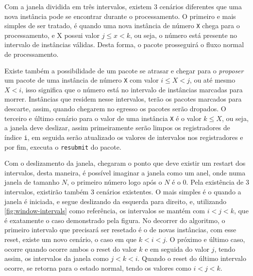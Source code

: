 \documentclass[
    12pt,
    openright, 
    oneside,
    a4paper,
    french,
    english,
    brazil
    ]{facom-ufu-abntex2}
\theoremstyle{definition}
\begin{document}

Com a janela dividida em três intervalos, existem 3 cenários diferentes que uma nova instância pode se encontrar durante o
processamento. O primeiro e mais simples de ser tratado, é quando uma nova instância de número \texttt{X} chega para
o processamento, e X possui valor $j \leq x < k$, ou seja, o número está presente no intervalo de instâncias válidas. 
Desta forma, o pacote prosseguirá o fluxo normal de processamento.

Existe também a possibilidade de um pacote se atrasar e chegar para o \emph{proposer} um pacote de uma instância de número
\texttt{X} com valor $i \leq X < j$, ou até mesmo $X < i$, isso significa que o número está no intervalo de instâncias
marcadas para morrer. Instâncias que residem nesse intervalos, terão os pacotes marcados para descarte, assim, quando
chegarem no egresso os pacotes serão dropados.
O terceiro e último cenário para o valor de uma instância \texttt{X} é o valor $k \leq X$, ou seja, a janela deve deslizar,
assim primeiramente serão limpos os registradores de índice \texttt{i}, em seguida serão atualizado os valores de
intervalos nos registradores e por fim, executa o \texttt{resubmit} do pacote.

Com o deslizamento da janela, chegaram o ponto que deve existir um restart dos intervalos, desta maneira, é possível
imaginar a janela como um anel, onde numa janela de tamanho $N$, o primeiro número logo após o $N$ é o 0. Pela 
existência de 3 intervalos, existirão também 3 cenários existentes. O mais simples é o quando a janela é iniciada,
e segue deslizando da esquerda para direito, e, utilizando \ref{fig:window-intervals} como referência, os intervalos
se mantém com $i < j < k$, que é exatamente o caso demonstrado pela figura. No decorrer do algoritmo, o primeiro intervalo
que precisará ser resetado é o de novas instâncias, com esse reset, existe um novo cenário, o caso em que $k < i < j$.
O próximo e último caso, ocorre quando ocorre ambos o reset do valor $k$ e em seguida do valor $j$, tendo assim,
os intervalos da janela como $j < k < i$. Quando o reset do último intervalo ocorre, se retorna para o estado normal,
tendo os valores como $i < j < k$.
\end{document}
